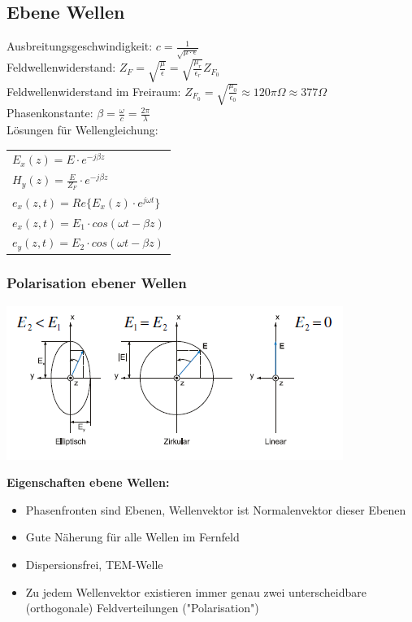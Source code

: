 \documentclass[english]{latex4ei/latex4ei_sheet}
\begin{document}
\begin{sectionbox}
    \subsection{Ebene Wellen}
    Ausbreitungsgeschwindigkeit: $c = \frac{1}{\sqrt{\mu \cdot \epsilon}}$\\
    Feldwellenwiderstand: $Z_F = \sqrt{\frac{\mu}{\epsilon}} = \sqrt{\frac{\mu_r}{\epsilon_r}}Z_{F_0}$\\
    Feldwellenwiderstand im Freiraum: $Z_{F_0} = \sqrt{\frac{\mu_0}{\epsilon_0}} \approx 120\pi\Omega \approx 377\Omega$\\
    Phasenkonstante: $\beta = \frac{\omega}{c} = \frac{2\pi}{\lambda}$\\

    Lösungen für Wellengleichung:

    \begin{tabular*}{\columnwidth}{l}
        $E_x(z) = E\cdot e^{-j\beta z}$ \\
        $H_y(z) = \frac{E}{Z_F} \cdot e^{-j\beta z}$\\
        $e_x(z,t) = Re\{ E_x(z) \cdot e^{j\omega t} \}$\\
        $e_x(z,t) = E_1 \cdot cos(\omega t - \beta z)$\\
        $e_y(z,t) = E_2 \cdot cos(\omega t - \beta z)$\\
    \end{tabular*}

    \subsubsection{Polarisation ebener Wellen}

    \begin{center}\includegraphics[width = 0.8\columnwidth]{./img/polarisation_ebener_wellen.png} \end{center}
    \textbf{Eigenschaften ebene Wellen:}
    \begin{itemize}
        \item Phasenfronten sind Ebenen, Wellenvektor ist Normalenvektor dieser Ebenen
        \item Gute Näherung für alle Wellen im Fernfeld
        \item Dispersionsfrei, TEM-Welle
        \item Zu jedem Wellenvektor existieren immer genau zwei unterscheidbare (orthogonale) Feldverteilungen ("Polarisation")
    \end{itemize}


\end{sectionbox}
\end{document}
